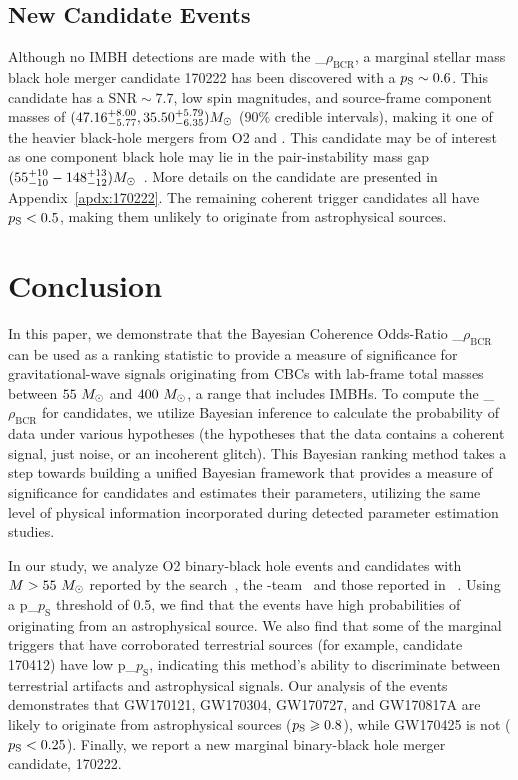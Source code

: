 \documentclass[useAMS,fleqn, usenatbib, final]{mnras}
\newcommand{\pycbc}{{\sc {{PyCBC}}}\xspace}
\newcommand{\GWTC}{{\sc {{GWTC-1}}}\xspace}
\newcommand{\IAS}{{\sc {{IAS}}}\xspace}
\newcommand{\fancytext}[1]{{\relax\ifmmode#1\else $#1$\fi}\xspace}
\newcommand{\mathcmd}[1]{{\sc \relax\ifmmode#1\else $#1$\fi}\xspace}
\newcommand{\bcr}{\mathcmd{\rho_\text{BCR}}}
\newcommand{\msun}{\mathcmd{M_\odot}}
\newcommand{\totMlab}{\mathcmd{M}}
\newcommand{\pastrobcr}{\fancytext{p_\text{S}}}
\begin{document}
\subsection{New Candidate Events}
Although no IMBH detections are made with the \bcr, a marginal stellar mass black hole merger candidate 170222 has been discovered with a ${\pastrobcr\sim0.6}$. This candidate has a ${\text{SNR}\sim7.7}$, low spin magnitudes, and source-frame component masses of ${({47.16}_{-5.77}^{+8.00}, {35.50}_{-6.35}^{+5.79}) \msun}$ ($90\%$ credible intervals), making it one of the heavier black-hole mergers from O2 and \GWTC. This candidate may be of interest as one component black hole may lie in the pair-instability mass gap $({55^{+10}_{-10}-148^{+13}_{-12})\msun}$~\citep{Woosley:2021:arXiv, Heger:2002:ApJ}. More details on the candidate are presented in Appendix~\ref{apdx:170222}. The remaining coherent trigger candidates all have ${\pastrobcr<0.5}$, making them unlikely to originate from astrophysical sources. 

\section{Conclusion}
\label{sec:Conclusion}

In this paper, we demonstrate that the Bayesian Coherence Odds-Ratio \bcr~\citep{BCR1} can be used as a ranking statistic to provide a measure of significance for gravitational-wave signals originating from CBCs with lab-frame total masses between $55~\msun$ and $400~\msun$, a range that includes IMBHs. To compute the \bcr for candidates, we utilize Bayesian inference to calculate the probability of data under various hypotheses (the hypotheses that the data contains a coherent signal, just noise, or an incoherent glitch). This Bayesian ranking method takes a step towards building a unified Bayesian framework that provides a measure of significance for candidates and estimates their parameters, utilizing the same level of physical information incorporated during detected parameter estimation studies. 

In our study, we analyze O2 binary-black hole events and candidates with ${\totMlab > 55~\msun}$ reported by the \pycbc search~\citep{pycbc_ogc_2}, the \IAS-team~\citep{IAS1, IAS2} and those reported in \GWTC~\citep{GWTC1}. Using a \pastrobcr threshold of 0.5, we find that the \GWTC events have high probabilities of originating from an astrophysical source. We also find that some of the \GWTC marginal triggers that have corroborated terrestrial sources (for example, candidate 170412) have low \pastrobcr, indicating this method's ability to discriminate between terrestrial artifacts and astrophysical signals. Our analysis of the \IAS events demonstrates that GW170121, GW170304, GW170727, and GW170817A are likely to originate from astrophysical sources (${\pastrobcr\geq0.8}$), while GW170425 is not (${\pastrobcr<0.25}$). Finally, we report a new marginal binary-black hole merger candidate, 170222. 
\end{document}
